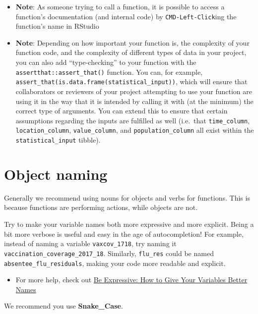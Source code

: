 \documentclass[]{book}
\providecommand{\tightlist}{%
  \setlength{\itemsep}{0pt}\setlength{\parskip}{0pt}}
\begin{document}
\begin{itemize}
\item
  \textbf{Note}: As someone trying to call a function, it is possible to access a function's documentation (and internal code) by \texttt{CMD-Left-Click}ing the function's name in RStudio
\item
  \textbf{Note}: Depending on how important your function is, the complexity of your function code, and the complexity of different types of data in your project, you can also add ``type-checking'' to your function with the \texttt{assertthat::assert\_that()} function. You can, for example, \texttt{assert\_that(is.data.frame(statistical\_input))}, which will ensure that collaborators or reviewers of your project attempting to use your function are using it in the way that it is intended by calling it with (at the minimum) the correct type of arguments. You can extend this to ensure that certain assumptions regarding the inputs are fulfilled as well (i.e.~that \texttt{time\_column}, \texttt{location\_column}, \texttt{value\_column}, and \texttt{population\_column} all exist within the \texttt{statistical\_input} tibble).
\end{itemize}

\hypertarget{object-naming}{%
\section{Object naming}\label{object-naming}}

Generally we recommend using nouns for objects and verbs for functions. This is because functions are performing actions, while objects are not.

Try to make your variable names both more expressive and more explicit. Being a bit more verbose is useful and easy in the age of autocompletion! For example, instead of naming a variable \texttt{vaxcov\_1718}, try naming it \texttt{vaccination\_coverage\_2017\_18}. Similarly, \texttt{flu\_res} could be named \texttt{absentee\_flu\_residuals}, making your code more readable and explicit.

\begin{itemize}
\tightlist
\item
  For more help, check out \href{https://spin.atomicobject.com/2017/11/01/good-variable-names/}{Be Expressive: How to Give Your Variables Better Names}
\end{itemize}

We recommend you use \textbf{Snake\_Case}.
\end{document}
